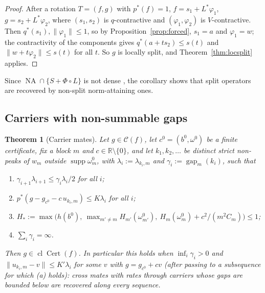 \documentclass[10pt]{amsart}
\newtheorem{theorem}{Theorem}[section]
\theoremstyle{definition}
\theoremstyle{remark}
\newcommand{\NA}{\operatorname{NA}}
\newcommand{\supp}{\operatorname{supp}}
\newcommand{\R}{\mathbb R}
\newcommand{\Cset}{\mathcal C}
\newcommand{\Cert}{\operatorname{Cert}}
\newcommand{\cl}{\operatorname{cl}}
\newcommand{\gap}{\operatorname{gap}}
\begin{document}
\begin{proof}
After a rotation $T=(f,g)$ with $p^*(f)=1$, $f=s_1+L^*\varphi_1$,
$g=s_2+L^*\varphi_2$, where $(s_1,s_2)$ is $q$-contractive and
$(\varphi_1,\varphi_2)$ is $V$-contractive.  Then $q^*(s_1),\|\varphi_1\|\le
1$, so by Proposition~\ref{prop:forced}, $s_1=a$ and $\varphi_1=w$; the
contractivity of the components gives $q^*(a+ts_2)\le s(t)$ and
$\|w+t\varphi_2\|\le s(t)$ for all $t$.  So $g$ is locally split, and
Theorem~\ref{thm:locsplit} applies.
\end{proof}

Since $\NA\cap\{S+\Phi\circ L\}$ is not dense \cite[Section~3]{PrA}, the
corollary shows that split operators are recovered by non-split
norm-attaining ones.

\subsection{Carriers with non-summable gaps}

\begin{theorem}[Carrier mates]\label{thm:carriers}
Let $g\in\Cset(f)$, let $c^0=(b^0,\omega^0)$ be a finite certificate, fix a
block $m$ and $c\in\R\setminus\{0\}$, and let $k_1,k_2,\dots$ be distinct
strict non-peaks of $w_m$ outside $\supp\omega^0_m$, with
$\lambda_i:=\lambda_{k_i,m}$ and $\gamma_i:=\gap_m(k_i)$, such that
\begin{enumerate}
\item[(a)] $\gamma_{i+1}\lambda_{i+1}\le\gamma_i\lambda_i/2$ for all $i$;
\item[(b)] $p^*(g-g_{c^0}-c\,u_{k_i,m})\le K\lambda_i$ for all $i$;
\item[(c)] $H_*:=\max\big(h(b^0),\ \max_{m'\ne m}H_{m'}(\omega^0_{m'}),\
H_m(\omega^0_m)+c^2/(m^2C_m)\big)\le1$;
\item[(d)] $\sum_i\gamma_i=\infty$.
\end{enumerate}
Then $g\in\cl\Cert(f)$.  In particular this holds when $\inf_i\gamma_i>0$
and $\|u_{k_i,m}-v\|\le K'\lambda_i$ for some $v$ with $g=g_{c^0}+cv$
\textup{(}after passing to a subsequence for which \textup{(a)}
holds\textup{)}: cross mates with rates through carriers whose gaps are
bounded below are recovered along every sequence.
\end{theorem}
\end{document}
